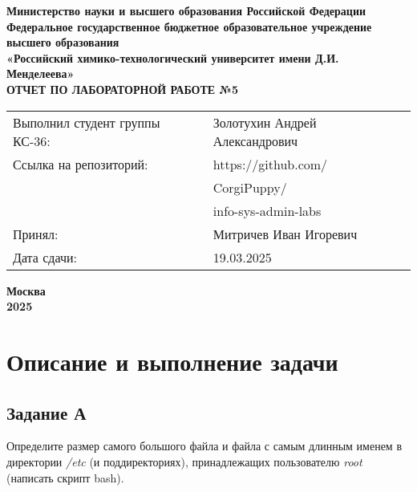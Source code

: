 \documentclass[12pt, a4paper]{report}
\begin{document}
	\begin{titlepage}
			\begin{center}
				\large \textbf{Министерство науки и высшего образования Российской Федерации} \\
				\large \textbf{Федеральное государственное бюджетное образовательное учреждение высшего образования} \\
				\large \textbf{«Российский химико-технологический университет имени Д.И. Менделеева»} \\

				\vspace*{4cm}
				\LARGE \textbf{ОТЧЕТ ПО ЛАБОРАТОРНОЙ РАБОТЕ №5}

				\vspace*{4cm}
				\begin{flushright}
					\Large
					\begin{tabular}{>{\raggedleft\arraybackslash}p{8.85cm} p{10.8cm}}
						Выполнил студент группы КС-36: & Золотухин Андрей Александрович \\
						Ссылка на репозиторий: & https://github.com/ \\ 
						& CorgiPuppy/ \\
						& info-sys-admin-labs \\
						Принял: & Митричев Иван Игоревич \\
						Дата сдачи: & 19.03.2025 \\
					\end{tabular}

				\end{flushright}

				\vspace*{6cm}
				\Large \textbf{Москва \\ 2025}
			\end{center}
		\end{titlepage}
		
		\tableofcontents	
		\thispagestyle{empty}
		\newpage

		
		\section*{Описание и выполнение задачи}
		\large
		
		\subsection*{Задание А}
		Определите размер самого большого файла и файла с самым длинным именем в директории \textit{/etc} (и поддиректориях), принадлежащих пользователю \textit{root} (написать скрипт bash).
\end{document}
